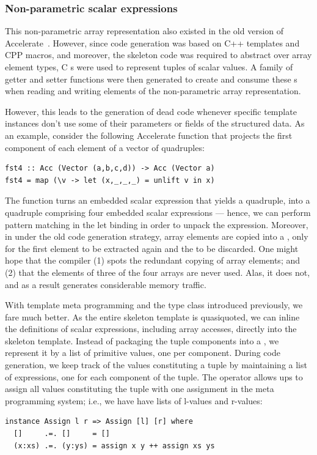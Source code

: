 \subsubsection{Non-parametric scalar expressions}

This non-parametric array representation also existed in the old version of
Accelerate~\cite{Chakravarty:2011fr}. However, since code generation was based
on C++ templates and CPP macros, and moreover, the skeleton code was required to
abstract over array element types, C s were used to represent
tuples of scalar values. A family of getter and setter functions were then
generated to create and consume these s when reading and writing
elements of the non-parametric array representation.

However, this leads to the generation of dead code whenever specific template
instances don't use some of their parameters or fields of the structured data.
As an example, consider the following Accelerate function that projects the
first component of each element of a vector of quadruples:
%
\begin{lstlisting}[style=haskell]
fst4 :: Acc (Vector (a,b,c,d)) -> Acc (Vector a)
fst4 = map (\v -> let (x,_,_,_) = unlift v in x)
\end{lstlisting}
%
The function  turns an embedded scalar expression that yields a
quadruple, into a quadruple comprising four embedded scalar expressions ---
hence, we can perform pattern matching in the let binding in order to unpack the
expression. Moreover, in  under the old code generation strategy,
array elements are copied into a , only for the first element to be
extracted again and the  to be discarded. One might hope that the
\CUDA compiler (1) spots the redundant copying of array elements; and (2) that
the elements of three of the four arrays are never used. Alas, it does not, and
as a result  generates considerable memory traffic.

With template meta programming and the  type class introduced
previously, we fare much better. As the entire skeleton template is quasiquoted,
we can inline the definitions of scalar expressions, including array accesses,
directly into the skeleton template. Instead of packaging the tuple components
into a , we represent it by a list of primitive values, one per
component. During code generation, we keep track of the values constituting a
tuple by maintaining a list of expressions, one for each component of the tuple.
The  operator allows ups to assign all values constituting the tuple
with one assignment in the meta programming system; i.e., we have have lists of
l-values and r-values:
%
\begin{lstlisting}[style=haskell]
instance Assign l r => Assign [l] [r] where
  []     .=. []     = []
  (x:xs) .=. (y:ys) = assign x y ++ assign xs ys
\end{lstlisting}


